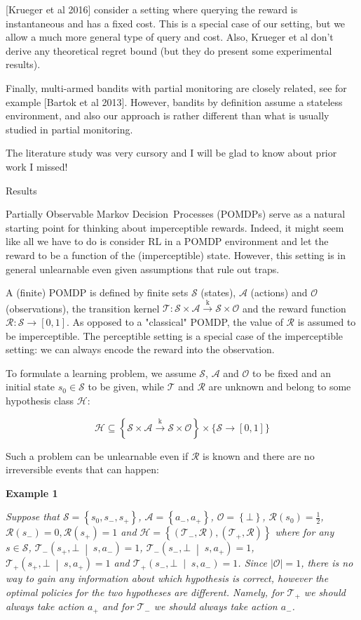 \documentclass[a4paper]{article}
\newcommand{\Co}[1]{}
\newcommand{\San}[1]{}
\newcommand{\AP}[1]{\left(#1\right)}
\newcommand{\AC}[1]{\left\{#1\right\}}
\newcommand{\APM}[2]{\left(#1\;\middle\vert\;#2\right)}
\newcommand{\Abs}[1]{\left\vert #1 \right\vert}
\newcommand{\K}{\xrightarrow{\mathrm{k}}}
\newcommand{\St}{\mathcal{S}}
\newcommand{\A}{\mathcal{A}}
\newcommand{\Ob}{\mathcal{O}}
\newcommand{\R}{\mathcal{R}}
\newcommand{\T}{\mathcal{T}}
\newcommand{\Hy}{\mathcal{H}}
\begin{document}
[Krueger et al 2016]\San{(https://pdfs.semanticscholar.org/a47f/52b25ce1e56a03876d9c0fd7c45e63270eb4.pdf)}\Co{s} consider a setting where querying the reward is instantaneous and has a fixed cost. This is a special case of our setting, but we allow a much more general type of query and cost. Also, Krueger et al don't derive any theoretical regret bound (but they do present some experimental results).

Finally, multi-armed bandits with partial monitoring are closely related, see for example [Bartok et al 2013]\San{(http://www.mit.edu/~rakhlin/papers/partial_monitoring.pdf)}\Co{s}. However, bandits by definition assume a stateless environment, and also our approach is rather different than what is usually studied in partial monitoring.

The literature study was very cursory and I will be glad to know about prior work I missed!

\begin{Huge}Results\end{Huge}

Partially Observable Markov Decision\ Processes (POMDPs) serve as a natural starting point for thinking about imperceptible rewards. Indeed, it might seem like all we have to do is consider RL in a POMDP environment and let the reward to be a function of the (imperceptible) state. However, this setting is in general unlearnable even given assumptions that rule out traps.

A (finite) POMDP is defined by finite sets $\St$ (states), $\A$ (actions) and $\Ob$ (observations), the transition kernel $\T:\St\times\A\K\St\times\Ob$ and the reward function $\R:\St\rightarrow[0,1]$. As opposed to a "classical" POMDP, the value of $\R$ is assumed to be imperceptible. The perceptible setting is a special case of the imperceptible setting: we can always encode the reward into the observation.

To formulate a learning problem, we assume $\St$, $\A$ and $\Ob$ to be fixed and an initial state $s_0\in\St$ to be given, while $\T$ and $\R$ are unknown and belong to some hypothesis class $\Hy$:

$$\Hy\subseteq\AC{\St\times\A\K\St\times\Ob}\times\bigg\{\St\rightarrow[0,1]\bigg\}$$

Such a problem can be unlearnable even if $\R$ is known and there are no irreversible events that can happen:

\textbf{Example 1}\Co{b}

\textit{Suppose that $\St=\AC{s_0,s_-,s_+}$, $\A=\AC{a_-,a_+}$, $\Ob=\AC{\bot}$, $\R\AP{s_0}=\frac{1}{2}$, $\R\AP{s_-}=0, \R\AP{s_+}=1$ and $\Hy=\AC{\AP{\T_-,\R},\AP{\T_+,\R}}$ where for any $s\in\St$, $\T_-\APM{s_+,\bot}{s,a_-}=1$, $\T_-\APM{s_-,\bot}{s,a_+}=1$, $\T_+\APM{s_+,\bot}{s,a_+}=1$ and $\T_+\APM{s_-,\bot}{s,a_-}=1$. Since $\Abs{\Ob}=1$, there is no way to gain any information about which hypothesis is correct, however the optimal policies for the two hypotheses are different. Namely, for $\T_+$ we should always take action $a_+$ and for $\T_-$ we should always take action $a_-$.}\Co{i}
\end{document}
